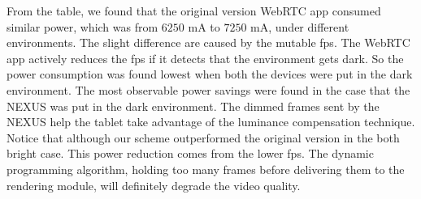 From the table, we found that the original version WebRTC app consumed
similar power, which was from $6250$ mA to $7250$ mA, under different
environments. The slight difference are caused by the mutable fps. The
WebRTC app actively reduces the fps if it detects that the environment
gets dark. So the power consumption was found lowest when both the
devices were put in the dark environment. The most observable power
savings were found in the case that the NEXUS was put in the dark
environment. The dimmed frames sent by the NEXUS help the tablet take
advantage of the luminance compensation technique.  Notice that
although our scheme outperformed the original version in the both
bright case. This power reduction comes from the lower fps. The
dynamic programming algorithm, holding too many frames before
delivering them to the rendering module, will definitely degrade the
video quality.


